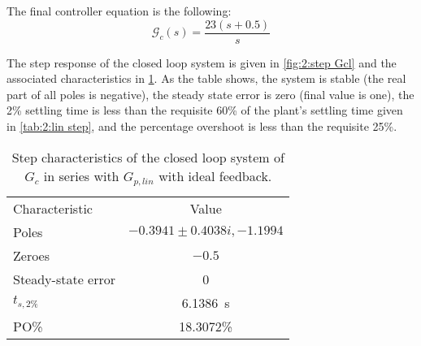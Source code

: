 The final controller equation is the following:
\begin{equation}
	\label{eq:2:Gc}
	\mathcal{G}_c(s) = \frac{23(s+0.5)}{s}
\end{equation}

The step response of the closed loop system is given in \cref{fig:2:step Gcl} and the associated characteristics in \cref{tab:2:step Gcl}. As the table shows, the system is stable (the real part of all poles is negative), the steady state error is zero (final value is one), the 2\% settling time is less than the requisite 60\% of the plant's settling time given in \cref{tab:2:lin step}, and the percentage overshoot is less than the requisite 25\%.

\begin{table}[h]
	\centering
	\begin{tabular}{lc}
		\toprule
		Characteristic&Value\\
		\cmidrule(r){1-1}\cmidrule(l){2-2}
		Poles&$-0.3941\pm\num{0.4038i},-1.1994$\\
		Zeroes&$-0.5$\\
		Steady-state error&0\\
		$t_{s,2\%}$&\SI{6.1386}{\second}\\
		PO\%&18.3072\%\\
		\bottomrule
	\end{tabular}
	\caption{Step characteristics of the closed loop system of $G_c$ in series with $G_{p,lin}$ with ideal feedback.}
	\label{tab:2:step Gcl}
\end{table}


